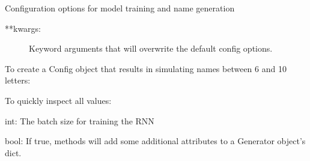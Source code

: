 \documentclass[letterpaper,10pt,english]{sphinxmanual}
\begin{document}
\begin{fulllineitems}
\label{\detokenize{modules:sng.Config.Config}}
Configuration options for model training and name generation
\begin{description}
\item[{**kwargs:}] \leavevmode
Keyword arguments that will overwrite the default config options.

\end{description}

To create a Config object that results in simulating names between
6 and 10 letters:

%
\begin{sphinxVerbatim}[commandchars=\\\{\}]
  
\end{sphinxVerbatim}

To quickly inspect all values:

%
\begin{sphinxVerbatim}[commandchars=\\\{\}]
\end{sphinxVerbatim}

\begin{fulllineitems}
\label{\detokenize{modules:sng.Config.Config.batch_size}}
int: The batch size for training the RNN

\end{fulllineitems}


\begin{fulllineitems}
\label{\detokenize{modules:sng.Config.Config.debug}}
bool: If true, methods will add some additional attributes
to a Generator object’s  dict.


\end{fulllineitems}
\end{fulllineitems}
\end{document}
